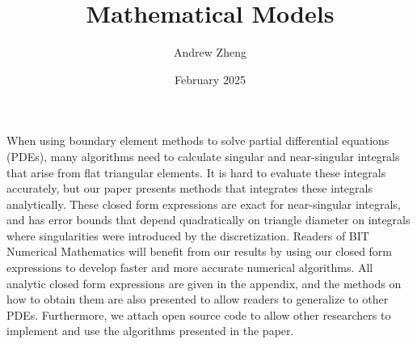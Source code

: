 \documentclass{article}
\title{Mathematical Models}
\author{Andrew Zheng}
\date{February 2025}
\numberwithin{equation}{section}
\begin{document}

When using boundary element methods to solve partial differential equations (PDEs), many algorithms need to calculate singular and near-singular integrals that arise from flat triangular elements. 
It is hard to evaluate these integrals accurately, but our paper presents methods that integrates these integrals analytically. These closed form expressions are exact for near-singular integrals, and has error bounds that depend quadratically on triangle diameter on integrals where singularities were introduced by the discretization. 
Readers of BIT Numerical Mathematics will benefit from our results by using our closed form expressions to develop faster and more accurate numerical algorithms. All analytic closed form expressions are given in the appendix, and the methods on how to obtain them are also presented to allow readers to generalize to other PDEs. 
Furthermore, we attach open source code to allow other researchers to implement and use the algorithms presented in the paper. 


\end{document}
